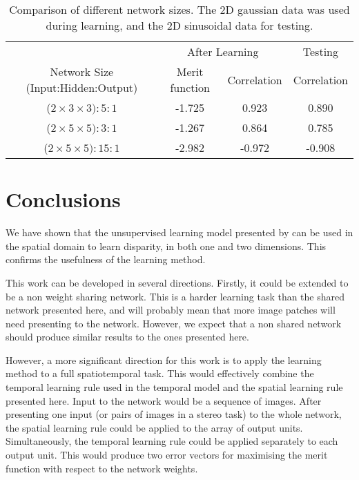 \documentclass[a4paper]{article}
\begin{document}
\begin{table}[htbp]
  \begin{center}
    \leavevmode
    \begin{tabular}{c|cc|c}
       & \multicolumn{2}{c|}{After Learning} & Testing \\
      Network Size (Input:Hidden:Output) &  Merit function &
       Correlation &  Correlation\\ \hline
      ($2 \times 3\times3):5:1 $& -1.725 & 0.923   & 0.890\\
      ($2 \times 5\times5):3:1 $& -1.267 & 0.864   & 0.785\\
      ($2 \times 5\times5):15:1$& -2.982 & -0.972  & -0.908
    \end{tabular}
    \caption{Comparison of different network sizes.  The 2D gaussian
      data was used during learning, and the 2D sinusoidal data for testing.}
    \label{tab:differentnetsizes}
  \end{center}
\end{table}

\clearpage


\section{Conclusions}

We have shown that the unsupervised learning model presented by
\cite{stone95} can be used in the spatial domain to learn disparity,
in both one and two dimensions. This confirms the usefulness of the
learning method.

This work can be developed in several directions.  Firstly, it could be
extended to be a non weight sharing network.  This is a harder learning
task than the shared network presented here, and will probably mean
that more image patches will need presenting to the network.  However,
we expect that a non shared network should produce similar results to
the ones presented here.

However, a more significant direction for this work is to apply the
learning method to a full spatiotemporal task.  This would effectively
combine the temporal learning rule used in the temporal model and the
spatial learning rule presented here.  Input to the network would be a
sequence of images.  After presenting one input (or pairs of images in
a stereo task) to the whole network, the spatial learning rule could
be applied to the array of output units.  Simultaneously, the temporal
learning rule could be applied separately to each output unit.  This
would produce two error vectors for maximising the merit function with
respect to the network weights.
\end{document}
